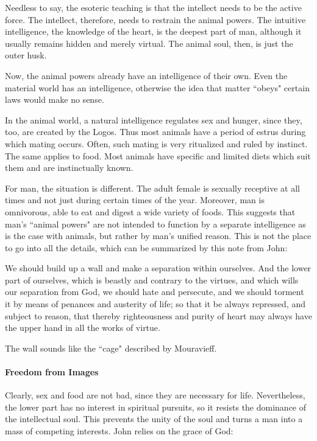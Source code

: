 Needless to say, the esoteric teaching is that the intellect needs to be the active force. The intellect, therefore, needs to restrain the animal powers. The intuitive intelligence, the knowledge of the heart, is the deepest part of man, although it usually remains hidden and merely virtual. The animal soul, then, is just the outer husk.

Now, the animal powers already have an intelligence of their own. Even the material world has an intelligence, otherwise the idea that matter ``obeys" certain laws would make no sense.

In the animal world, a natural intelligence regulates sex and hunger, since they, too, are created by the Logos. Thus most animals have a period of estrus during which mating occurs. Often, such mating is very ritualized and ruled by instinct. The same applies to food. Most animals have specific and limited diets which suit them and are instinctually known.

For man, the situation is different. The adult female is sexually receptive at all times and not just during certain times of the year. Moreover, man is omnivorous, able to eat and digest a wide variety of foods. This suggests that man's ``animal powers" are not intended to function by a separate intelligence as is the case with animals, but rather by man's unified reason. This is not the place to go into all the details, which can be summarized by this note from John:

\begin{quotex}
We should build up a wall and make a separation within ourselves. And the lower part of ourselves, which is beastly and contrary to the virtues, and which wills our separation from God, we should hate and persecute, and we should torment it by means of penances and austerity of life; so that it be always repressed, and subject to reason, that thereby righteousness and purity of heart may always have the upper hand in all the works of virtue. 

\end{quotex}
The wall sounds like the ``cage" described by Mouravieff.

\paragraph{Freedom from Images}
Clearly, sex and food are not bad, since they are necessary for life. Nevertheless, the lower part has no interest in spiritual pursuits, so it resists the dominance of the intellectual soul. This prevents the unity of the soul and turns a man into a mass of competing interests. John relies on the grace of God:

